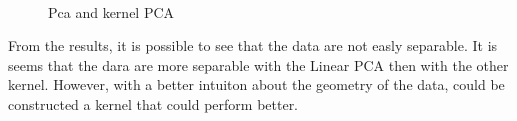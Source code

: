 \documentclass[12pt]{article}
\begin{document}
\begin{figure}[htbp]
    \centering
    {}\hfill
    {}\\
    {}\hfill
    {}
    \caption{Pca and kernel PCA }
    \label{fig:pca}
    
\end{figure}

From the results, it is possible to see that the data are not easly separable. It is seems that the dara are more separable with the Linear PCA then with the other kernel. 
However, with a better intuiton about the geometry of the data, could be constructed a kernel that could perform better.
\end{document}
